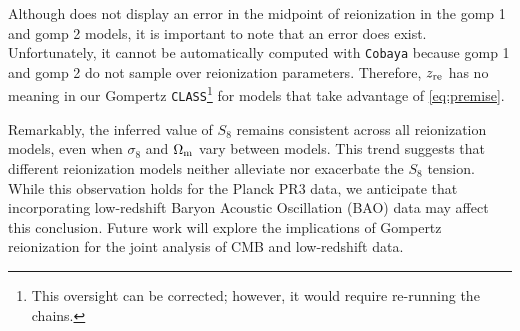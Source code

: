 Although  does not display an error in the midpoint of
reionization in the gomp 1 and gomp 2 models, it is important to note that an error
does exist. Unfortunately, it cannot be automatically computed with \texttt{Cobaya} because 
gomp 1 and gomp 2 do not sample over reionization parameters. Therefore, 
$z_{\mathrm{re}}$ has no meaning in our Gompertz \texttt{CLASS}\footnote{This oversight 
can be corrected; however, it would require re-running the chains.} for models
that take advantage of \cref{eq:premise}. 

Remarkably, the inferred value of $S_8$ remains consistent across all reionization
models, even when $\sigma_8$ and $\Omega_\mathrm{m}$ vary between models. This trend
suggests that different reionization models neither alleviate nor exacerbate the $S_8$
tension. While this observation holds for the Planck PR3 data, we anticipate that 
incorporating low-redshift Baryon Acoustic Oscillation (BAO) data may affect this 
conclusion. Future work will explore the implications of Gompertz reionization
for the joint analysis of CMB and low-redshift data.